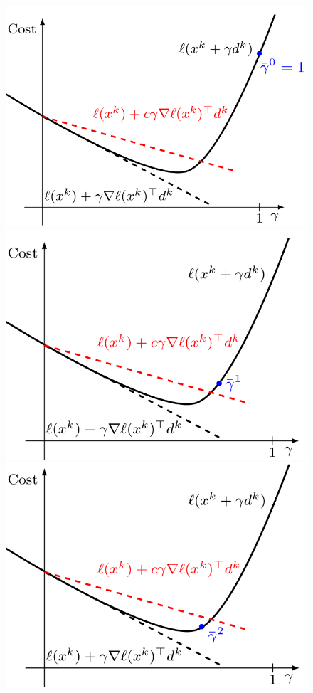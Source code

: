\documentclass[openany]{book}
\theoremstyle{definition}
\theoremstyle{remark}
\begin{document}
\begin{figure}[ht]
    \centering
    \begin{minipage}{.33\textwidth}
        \centering
        \includegraphics[width=0.9\linewidth]{armijo0}
    \end{minipage}%
    \begin{minipage}{.33\textwidth}
        \centering
        \includegraphics[width=0.9\linewidth]{armijo1}
    \end{minipage}%
    \begin{minipage}{.33\textwidth}
        \centering
        \includegraphics[width=0.9\linewidth]{armijo2}
    \end{minipage}%
\end{figure}
\end{document}
